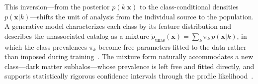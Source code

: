This inversion---from the posterior $p(k|\mathbf{x})$ to the class-conditional densities $p(\mathbf{x}|k)$---shifts the unit of analysis from the individual source to the population. A generative model characterizes each class by its feature distribution and describes the unassociated catalog as a mixture $\tilde{p}_\mathrm{unas}(\mathbf{x}) = \sum_k \pi_k\, p(\mathbf{x}|k)$, in which the class prevalences $\pi_k$ become free parameters fitted to the data rather than imposed during training~\cite{10.1145/3117807_Gonzalez_quantification,2024arXiv240100490M}.
The mixture form naturally accommodates a new class---dark matter subhalos---whose prevalence is left free and fitted directly, and supports statistically rigorous confidence intervals through the profile likelihood~\cite{Amerio:2025fhz}.


